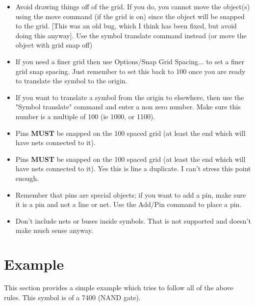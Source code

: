 \documentclass{article}
\begin{document}
\begin{itemize}

\item Avoid drawing things off of the grid.  If you do, you cannot move
      the object(s) using the move command (if the grid is on) since the
      object will be snapped to the grid. [This was an old bug, which I
      think has been fixed, but avoid doing this anyway].  Use the symbol
      translate command instead (or move the object with grid snap off)

\item If you need a finer grid then use Options/Snap Grid Spacing...
      to set a finer grid snap spacing.  Just remember to set this back
      to 100 once you are ready to translate the symbol to the origin.

\item If you want to translate a symbol from the origin to elsewhere,
      then use the "Symbol translate" command and enter a non zero number.
      Make sure this number is a multiple of 100 (ie 1000, or 1100).

\item Pins {\bf MUST} be snapped on the 100 spaced grid (at least the end
      which will have nets connected to it).

\item Pins {\bf MUST} be snapped on the 100 spaced grid (at least
      the end which will have nets connected to it).  Yes this is line
      a duplicate.  I can't stress this point enough.

\item Remember that pins are special objects; if you want to add
      a pin, make sure it is a pin and not a line or net.  Use the
      Add/Pin command to place a pin.

\item Don't include nets or buses inside symbols.  That is not supported
      and doesn't make much sense anyway.
\end{itemize}

\section{Example}

This section provides a simple example which tries to follow all of the above
rules.  This symbol is of a 7400 (NAND gate).
\end{document}
